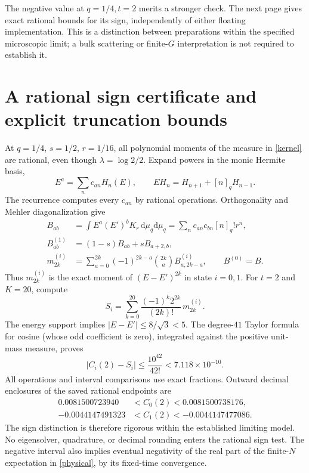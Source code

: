 \documentclass[11pt]{article}
\newcommand{\dd}{\mathrm d}
\begin{document}
The negative value at $q=1/4,t=2$ merits a stronger check. The next
page gives exact rational bounds for its sign, independently of either
floating implementation. This is a distinction between preparations
within the specified microscopic limit; a bulk scattering or finite-$G$
interpretation is not required to establish it.

\newpage
\section{A rational sign certificate and explicit truncation bounds}
At $q=1/4$, $s=1/2$, $r=1/16$, all polynomial moments of the measure
in \eqref{kernel} are rational, even though
$\lambda=\log 2/2$. Expand powers in the monic Hermite basis,
\begin{equation}
 E^a=\sum_n c_{an}H_n(E),\qquad
 EH_n=H_{n+1}+[n]_qH_{n-1}.
\end{equation}
The recurrence computes every $c_{an}$ by rational operations.
Orthogonality and Mehler diagonalization give
\begin{align}
 B_{ab}&=\int E^a(E')^bK_r\,\dd\mu_q\dd\mu_q
       =\sum_n c_{an}c_{bn}[n]_q!r^n,\nonumber\\
 B^{(1)}_{ab}&=(1-s)B_{ab}+sB_{a+2,b},\nonumber\\
 m_{2k}^{(i)}&=\sum_{a=0}^{2k}(-1)^{2k-a}\binom{2k}{a}
                   B^{(i)}_{a,2k-a},\qquad B^{(0)}=B.
\end{align}
Thus $m_{2k}^{(i)}$ is the exact moment of $(E-E')^{2k}$ in state
$i=0,1$. For $t=2$ and $K=20$, compute
\begin{equation}
 S_i=\sum_{k=0}^{20}\frac{(-1)^k2^{2k}}{(2k)!}\,m_{2k}^{(i)}.
\end{equation}
The energy support implies
$|E-E'|\le8/\sqrt3<5$. The degree-$41$ Taylor formula for cosine
(whose odd coefficient is zero), integrated against the positive
unit-mass measure, proves
\begin{equation}
 |C_i(2)-S_i|\le\frac{10^{42}}{42!}<7.118\times10^{-10}.
\end{equation}
All operations and interval comparisons use exact fractions. Outward
decimal enclosures of the saved rational endpoints are
\begin{align}
 0.0081500723940&<C_0(2)<0.0081500738176,\nonumber\\
 -0.0044147491323&<C_1(2)<-0.0044147477086.
\end{align}
The sign distinction is therefore rigorous within the established
limiting model. No eigensolver, quadrature, or decimal rounding enters
the rational sign test. The negative interval also implies eventual
negativity of the real part of the finite-$N$ expectation in
\eqref{physical}, by its fixed-time convergence.
\end{document}
